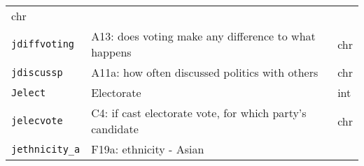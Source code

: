 \documentclass[]{article}
\begin{document}
\begin{longtable}[]{@{}lll@{}}
\begin{minipage}[t]{0.08\columnwidth}
chr\strut
\end{minipage}\tabularnewline
\begin{minipage}[t]{0.14\columnwidth}\raggedright\strut
\texttt{jdiffvoting}\strut
\end{minipage} & \begin{minipage}[t]{0.70\columnwidth}\raggedright\strut
A13: does voting make any difference to what happens\strut
\end{minipage} & \begin{minipage}[t]{0.08\columnwidth}\raggedright\strut
chr\strut
\end{minipage}\tabularnewline
\begin{minipage}[t]{0.14\columnwidth}\raggedright\strut
\texttt{jdiscussp}\strut
\end{minipage} & \begin{minipage}[t]{0.70\columnwidth}\raggedright\strut
A11a: how often discussed politics with others\strut
\end{minipage} & \begin{minipage}[t]{0.08\columnwidth}\raggedright\strut
chr\strut
\end{minipage}\tabularnewline
\begin{minipage}[t]{0.14\columnwidth}\raggedright\strut
\texttt{Jelect}\strut
\end{minipage} & \begin{minipage}[t]{0.70\columnwidth}\raggedright\strut
Electorate\strut
\end{minipage} & \begin{minipage}[t]{0.08\columnwidth}\raggedright\strut
int\strut
\end{minipage}\tabularnewline
\begin{minipage}[t]{0.14\columnwidth}\raggedright\strut
\texttt{jelecvote}\strut
\end{minipage} & \begin{minipage}[t]{0.70\columnwidth}\raggedright\strut
C4: if cast electorate vote, for which party's candidate\strut
\end{minipage} & \begin{minipage}[t]{0.08\columnwidth}\raggedright\strut
chr\strut
\end{minipage}\tabularnewline
\begin{minipage}[t]{0.14\columnwidth}\raggedright\strut
\texttt{jethnicity\_a}\strut
\end{minipage} & \begin{minipage}[t]{0.70\columnwidth}\raggedright\strut
F19a: ethnicity - Asian\strut

\end{minipage}
\end{longtable}
\end{document}
